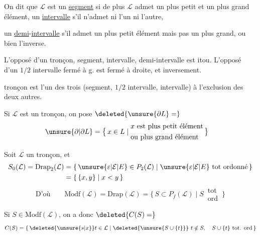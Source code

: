 
On dit que $\mathcal L$ est un \uline{segment} si de plus $\mathcal L$ admet un plus petit et
 un plus grand élément, un \uline{intervalle} s'il n'admet ni l'un ni l'autre,

un \uline{demi}-\uline{intervalle} s'il admet un plus petit élément mais pas un plus grand, ou bien l'inverse.

 L'opposé d'un tronçon, segment, intervalle, demi-intervalle est itou. L'opposé d'un $1/2$ intervalle fermé à g. est fermé à droite, et inversement.

 tronçon est l'un des trois (segment, $1/2$ intervalle, intervalle) à l'exclusion des deux autres.

Si $\mathcal L$ est un tronçon, on pose $\deleted{\unsure{\partial L}=}$
\[
\begin{aligned}
\unsure{\partial|\partial L}&=\bigl\{\,x\in L\mid
\begin{aligned}&x\text{ est plus petit élément}\\
&\text{ou plus grand élément}\end{aligned}\,\bigr\}
\end{aligned}
\]

Soit $\mathcal L$ un tronçon, et
\[
\begin{aligned}
S_0(\mathcal L)=\mathrm{Drap}_2(\mathcal L)&=\{\,\unsure{\varepsilon|\mathcal E|E}\in P_2(\mathcal L)\mid \unsure{\varepsilon|\mathcal E|E}\text{ tot ordonné}\,\}\\
&=\{\,\{x,y\}\mid x<y\,\}
\end{aligned}
\]
\[
\text{D'où}\qquad \mathrm{Modf}(\mathcal L)=\mathrm{Drap}(\mathcal L)
=\{\,S\subset P_f(\mathcal L)\mid S\,\substack{\text{tot}\\\text{ord}}\,\}
\]

Si $S\in\mathrm{Modf}(\mathcal L)$, on a donc $\deleted{C(S)=}$
\[
C(S)=\{\,\deleted{\unsure{s|x}}t\in\mathcal L\mid\deleted{\unsure{S\cup\{t\}}}\ t\notin S,\quad S\cup\{t\}\ \text{tot. ord}\,\}
\]

